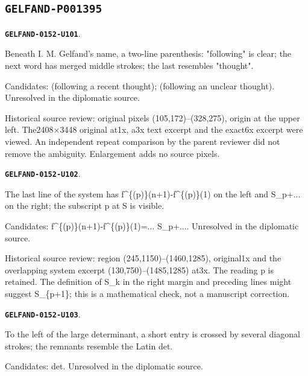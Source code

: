 \documentclass[11pt]{article}
\theoremstyle{definition}
\theoremstyle{remark}
\begin{document}
\subsection*{\texttt{GELFAND-P001395}}
\par\noindent\leavevmode{}\label{GELFAND-0152-U101}\label{GELFAND-P001395:speaker-parenthesis:note}\textbf{\texttt{GELFAND-0152-U101}}.\nopagebreak[4]\par
Beneath I. M. Gelfand's name, a two-line parenthesis: "following" is clear; the next word has merged middle strokes; the last resembles "thought".\par
Candidates: (following a recent thought); (following an unclear thought). Unresolved in the diplomatic source.\par
Historical source review: original pixels (105,172)–(328,275), origin at the upper left. The2408×3448 original at1x, a3x text excerpt and the exact6x excerpt were viewed. An independent repeat comparison by the parent reviewer did not remove the ambiguity. Enlargement adds no source pixels.\par\medskip
\par\noindent\leavevmode{}\label{GELFAND-0152-U102}\label{GELFAND-P001395:system-last-index:note}\textbf{\texttt{GELFAND-0152-U102}}.\nopagebreak[4]\par
The last line of the system has f\textasciicircum{}\{(p)\}(n+1)-f\textasciicircum{}\{(p)\}(1) on the left and S\_p+... on the right; the subscript p at S is visible.\par
Candidates: f\textasciicircum{}\{(p)\}(n+1)-f\textasciicircum{}\{(p)\}(1)=... S\_p+.... Unresolved in the diplomatic source.\par
Historical source review: region (245,1150)–(1460,1285), original1x and the overlapping system excerpt (130,750)–(1485,1285) at3x. The reading p is retained. The definition of S\_k in the right margin and preceding lines might suggest S\_\{p+1\}; this is a mathematical check, not a manuscript correction.\par\medskip
\par\noindent\leavevmode{}\label{GELFAND-0152-U103}\label{GELFAND-P001395:determinant-cancellation:note}\textbf{\texttt{GELFAND-0152-U103}}.\nopagebreak[4]\par
To the left of the large determinant, a short entry is crossed by several diagonal strokes; the remnants resemble the Latin det.\par
Candidates: det. Unresolved in the diplomatic source.\par
\end{document}
